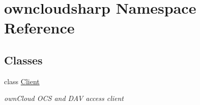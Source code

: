 \hypertarget{namespaceowncloudsharp}{}\section{owncloudsharp Namespace Reference}
\label{namespaceowncloudsharp}
\subsection*{Classes}
\begin{DoxyCompactItemize}
\item 
class \hyperlink{classowncloudsharp_1_1_client}{Client}
\begin{DoxyCompactList}\small\item\em own\+Cloud O\+C\+S and D\+A\+V access client \end{DoxyCompactList}\end{DoxyCompactItemize}
